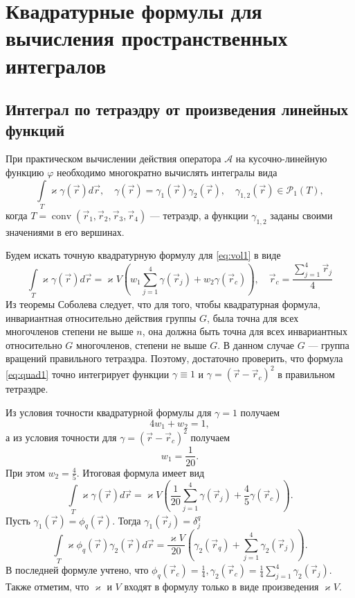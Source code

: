 \section{Квадратурные формулы для вычисления пространственных интегралов}
\label{sec:quad}

\subsection{Интеграл по тетраэдру от произведения линейных функций}

При практическом вычислении действия оператора $\mathcal{A}$ на кусочно-линейную функцию $\varphi$ необходимо многократно вычислять
интегралы вида
\begin{equation}
\int\limits_T \varkappa \gamma(\vec r) d \vec r, \quad \gamma(\vec r) = \gamma_1(\vec r)\gamma_2(\vec r),\quad \gamma_{1,2}(\vec r) \in \mathcal{P}_1(T),
\label{eq:vol1}
\end{equation}
когда $T = \operatorname{conv}(\vec r_1,\vec r_2,\vec r_3,\vec r_4)$ --- тетраэдр, а функции $\gamma_{1,2}$ заданы своими значениями в его вершинах. 

Будем искать точную квадратурную формулу для \eqref{eq:vol1}
в виде
\begin{equation}
\int\limits_T \varkappa \gamma(\vec r) d \vec r = \varkappa V \left(w_1 \sum_{j=1}^4 \gamma(\vec r_j) + w_2 \gamma(\vec r_c)\right),
\quad \vec r_c = \frac{\sum_{j=1}^4 \vec r_j}{4}
\label{eq:quad1}
\end{equation}
Из теоремы Соболева \cite{Sobolev1962} следует, что для того, чтобы квадратурная формула, инвариантная относительно действия группы $G$, была точна для всех многочленов степени не выше $n$, она должна быть точна для всех инвариантных относительно $G$ многочленов, степени не выше $G$. В данном случае $G$ --- группа вращений правильного тетраэдра. Поэтому, достаточно проверить, что формула \eqref{eq:quad1} точно интегрирует функции $\gamma \equiv 1$ и $\gamma = (\vec r - \vec r_c)^2$ в правильном тетраэдре.

Из условия точности квадратурной формулы для $\gamma = 1$ получаем
\[
4w_1 + w_2 = 1,
\]
а из условия точности для $\gamma = (\vec r - \vec r_c)^2$ получаем
\[
w_1 = \frac{1}{20}.
\]
При этом $w_2 = \frac{4}{5}$. Итоговая формула имеет вид
\begin{equation}
\int\limits_T \varkappa \gamma(\vec r) d \vec r = \varkappa V \left(\frac{1}{20} \sum_{j=1}^4 \gamma(\vec r_j) + \frac{4}{5} \gamma(\vec r_c)\right).
\label{eq:quad1n2}
\end{equation}
Пусть $\gamma_1(\vec r) = \phi_q(\vec r)$. Тогда $\gamma_1(\vec r_j) = \delta_j^q$
\begin{equation}
\int\limits_T \varkappa \phi_q(\vec r) \gamma_2(\vec r) d \vec r = \frac{\varkappa V}{20} \left(\gamma_2(\vec r_q) + \sum_{j=1}^4\gamma_2(\vec r_j)\right).
\label{eq:quad1n3}
\end{equation}
В последней формуле учтено, что $\phi_q(\vec r_c) = \frac{1}{4}, \gamma_2(\vec r_c) = \frac{1}{4}\sum_{j=1}^4 \gamma_2(\vec r_j)$. Также отметим, что
$\varkappa$ и $V$ входят в формулу только в виде произведения $\varkappa V$.

